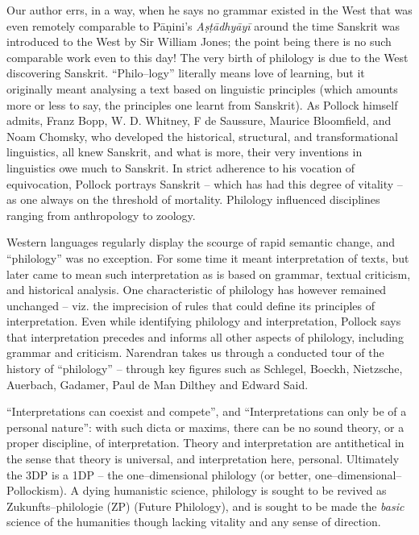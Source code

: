 Our author errs, in a way, when he says no grammar existed in the West that was even remotely comparable to Pāṇini’s \textit{Aṣṭādhyāyī} around the time Sanskrit was introduced to the West by Sir William Jones; the point being there is no such comparable work even to this day! The very birth of philology is due to the West discovering Sanskrit. “Philo–logy” literally means love of learning, but it originally meant analysing a text based on linguistic principles (which amounts more or less to say, the principles one learnt from Sanskrit). As Pollock himself admits, Franz Bopp, W. D. Whitney, F de Saussure, Maurice Bloomfield, and Noam Chomsky, who developed the historical, structural, and transformational linguistics, all knew Sanskrit, and what is more, their very inventions in linguistics owe much to Sanskrit. In strict adherence to his vocation of equivocation, Pollock portrays Sanskrit – which has had this degree of vitality – as one always on the threshold of mortality. Philology influenced disciplines ranging from anthropology to zoology.

Western languages regularly display the scourge of rapid semantic change, and “philology” was no exception. For some time it meant interpretation of texts, but later came to mean such interpretation as is based on grammar, textual criticism, and historical analysis. One characteristic of philology has however remained unchanged – viz. the imprecision of rules that could define its principles of interpretation. Even while identifying philology and interpretation, Pollock says that interpretation precedes and informs all other aspects of philology, including grammar and criticism. Narendran takes us through a conducted tour of the history of “philology” – through key figures such as Schlegel, Boeckh, Nietzsche, Auerbach, Gadamer, Paul de Man Dilthey and Edward Said.

“Interpretations can coexist and compete”, and “Interpretations can only be of a personal nature”: with such dicta or maxims, there can be no sound theory, or a proper discipline, of interpretation. Theory and interpretation are antithetical in the sense that theory is universal, and interpretation here, personal. Ultimately the 3DP is a 1DP – the one–dimensional philology (or better, one–dimensional–Pollockism). A dying humanistic science, philology is sought to be revived as Zukunfts–philologie (ZP) (Future Philology), and is sought to be made the \textit{basic} science of the humanities though lacking vitality and any sense of direction.

